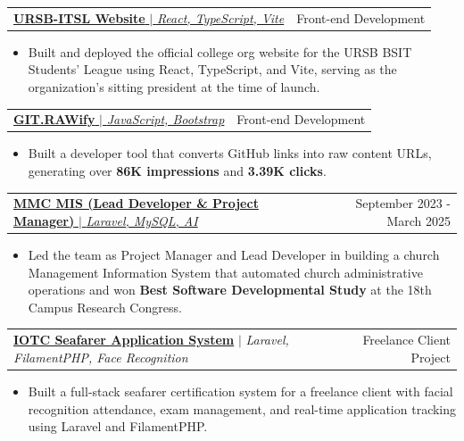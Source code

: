 \documentclass[a4paper,12pt]{article}
\makeatletter
\newcommand{\resumeItem}[1]{
  \item\small{
    {#1 \vspace{-2pt}}
  }
}
\newcommand{\resumeProjectHeading}[2]{
    \item
    \begin{tabular*}{0.97\textwidth}{l@{\extracolsep{\fill}}r}
      \small#1 & #2 \\
    \end{tabular*}\vspace{-7pt}
}
\newcommand{\resumeItemListStart}{\begin{itemize}}
\newcommand{\resumeItemListEnd}{\end{itemize}\vspace{-5pt}}
\makeatother
\begin{document}
    \resumeProjectHeading
        {\href{https://ursb-itsl.vercel.app/}
        {\textbf{URSB-ITSL Website} $|$ \emph{React, TypeScript, Vite}}}{Front-end Development}
        \resumeItemListStart
            \resumeItem{Built and deployed the official college org website for the URSB BSIT Students' League using React, TypeScript, and Vite, serving as the organization's sitting president at the time of launch.}
        \resumeItemListEnd

      
    \resumeProjectHeading
      {\href{https://git-rawify.vercel.app/}
      {\textbf{GIT.RAWify} $|$ \emph{JavaScript, Bootstrap}}}{Front-end Development}
      \resumeItemListStart
        \resumeItem{Built a developer tool that converts GitHub links into raw content URLs, generating over \textbf{86K impressions} and \textbf{3.39K clicks}.}
      \resumeItemListEnd
      
    \resumeProjectHeading
      {\href{https://mmchurch.online}
      {\textbf{MMC MIS (Lead Developer \& Project Manager)} $|$ \emph{Laravel, MySQL, AI}}}{September 2023 - March 2025}
      \resumeItemListStart
        \resumeItem{Led the team as Project Manager and Lead Developer in building a church Management Information System that automated church administrative operations and won \textbf{Best Software Developmental Study} at the 18th Campus Research Congress.}
      \resumeItemListEnd
      
    \resumeProjectHeading
      {\href{https://iotc-mis.site/}{\textbf{IOTC Seafarer Application System}} $|$ \emph{Laravel, FilamentPHP, Face Recognition}}{Freelance Client Project}
      \resumeItemListStart
        \resumeItem{Built a full-stack seafarer certification system for a freelance client with facial recognition attendance, exam management, and real-time application tracking using Laravel and FilamentPHP.}
      \resumeItemListEnd
      
    
\end{document}
